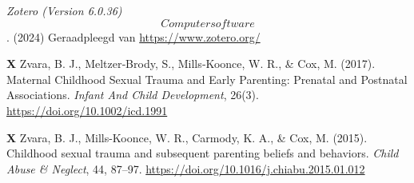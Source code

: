 \documentclass[12pt]{article}
\begin{document}
\emph{Zotero (Version 6.0.36)} \[Computer software\]. (2024)
Geraadpleegd van \url{https://www.zotero.org/}

\textbf{X} Zvara, B. J., Meltzer‐Brody, S., Mills‐Koonce, W. R., \& Cox,
M. (2017). Maternal Childhood Sexual Trauma and Early Parenting:
Prenatal and Postnatal Associations. \emph{Infant And Child
Development}, 26(3). \url{https://doi.org/10.1002/icd.1991}

\textbf{X} Zvara, B. J., Mills-Koonce, W. R., Carmody, K. A., \& Cox, M.
(2015). Childhood sexual trauma and subsequent parenting beliefs and
behaviors. \emph{Child Abuse \& Neglect}, 44, 87--97.
\url{https://doi.org/10.1016/j.chiabu.2015.01.012}



\end{document}
